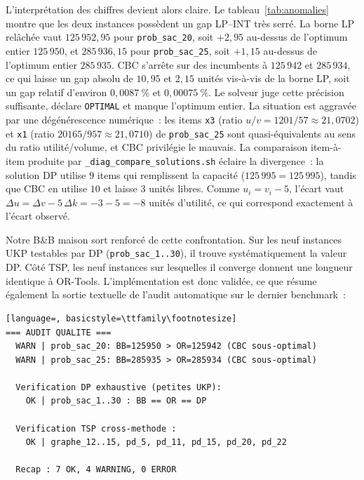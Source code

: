 \documentclass[11pt,a4paper]{article}
\begin{document}
L'interprétation des chiffres devient alors claire. Le tableau~\ref{tab:anomalies} montre que les deux instances possèdent un gap LP--INT très serré. La borne LP relâchée vaut $125\,952{,}95$ pour \texttt{prob\_sac\_20}, soit $+2{,}95$ au-dessus de l'optimum entier $125\,950$, et $285\,936{,}15$ pour \texttt{prob\_sac\_25}, soit $+1{,}15$ au-dessus de l'optimum entier $285\,935$. CBC s'arrête sur des incumbents à $125\,942$ et $285\,934$, ce qui laisse un gap absolu de $10{,}95$ et $2{,}15$ unités vis-à-vis de la borne LP, soit un gap relatif d'environ $0{,}0087~\%$ et $0{,}00075~\%$. Le solveur juge cette précision suffisante, déclare \texttt{OPTIMAL} et manque l'optimum entier. La situation est aggravée par une dégénérescence numérique~: les items \texttt{x3} (ratio $u/v = 1201/57 \approx 21{,}0702$) et \texttt{x1} (ratio $20165/957 \approx 21{,}0710$) de \texttt{prob\_sac\_25} sont quasi-équivalents au sens du ratio utilité/volume, et CBC privilégie le mauvais. La comparaison item-à-item produite par \texttt{\_diag\_compare\_solutions.sh} éclaire la divergence~: la solution DP utilise $9$ items qui remplissent la capacité ($125\,995 = 125\,995$), tandis que CBC en utilise $10$ et laisse $3$ unités libres. Comme $u_i = v_i - 5$, l'écart vaut $\Delta u = \Delta v - 5\,\Delta k = -3 - 5 = -8$ unités d'utilité, ce qui correspond exactement à l'écart observé.

Notre B\&B maison sort renforcé de cette confrontation. Sur les neuf instances UKP testables par DP (\texttt{prob\_sac\_1..30}), il trouve systématiquement la valeur DP. Côté TSP, les neuf instances sur lesquelles il converge donnent une longueur identique à OR-Tools. L'implémentation est donc validée, ce que résume également la sortie textuelle de l'audit automatique sur le dernier benchmark~:

\begin{lstlisting}[language=, basicstyle=\ttfamily\footnotesize]
=== AUDIT QUALITE ===
  WARN | prob_sac_20: BB=125950 > OR=125942 (CBC sous-optimal)
  WARN | prob_sac_25: BB=285935 > OR=285934 (CBC sous-optimal)

  Verification DP exhaustive (petites UKP):
    OK | prob_sac_1..30 : BB == OR == DP

  Verification TSP cross-methode :
    OK | graphe_12..15, pd_5, pd_11, pd_15, pd_20, pd_22

  Recap : 7 OK, 4 WARNING, 0 ERROR
\end{lstlisting}

\end{document}
